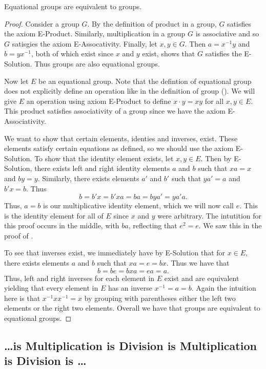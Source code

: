 \documentclass{article}
\begin{document}
\begin{theorem}
  Equational groups are equivalent to groups.
\end{theorem}
\begin{proof}
  Consider a group $G$.
  By the definition of product in a group, $G$ satisfies the axiom E-Product.
  Similarly, multiplication in a group $G$ is associative and so $G$ satisgies the axiom E-Assocativity.
  Finally, let $x, y \in G$.
  Then $a = x^{-1}y$ and $b = yx^{-1}$, both of which exist since $x$ and $y$ exist, shows that $G$ satisfies the E-Solution.
  Thus groups are also equational groups.

  Now let $E$ be an equational group.
  Note that the defintion of equational group does not explicitly define an operation like in the definition of group ().
  We will give $E$ an operation using axiom E-Product to define $x \cdot y = xy$ for all $x, y \in E$.
  This product satisfies associativity of a group since we have the axiom E-Associativity.

  We want to show that certain elements, identies and inverses, exist.
  These elements satisfy certain equations as defined, so we should use the axiom E-Solution.
  To show that the identity element exists, let $x, y \in E$.
  Then by E-Solution, there exists left and right identity elements $a$ and $b$ such that $xa = x$ and $by = y$.
  Similarly, there exists elements $a'$ and $b'$ such that $ya' = a$ and $b'x = b$.
  Thus
  \[
    b = b'x = b'xa = ba = bya' = ya' a.
  \]
  Thus, $a = b$ is our multiplicative identity element, which we will now call $e$.
  This is the identity element for all of $E$ since $x$ and $y$ were arbitrary.
  The intutition for this proof occurs in the middle, with $ba$, reflecting that $e^{2} = e$.
  We saw this in the proof of .

  To see that inverses exist, we immediately have by E-Solution that for $x \in E$, there exists elements $a$ and $b$ such that $xa = e = bx$.
  Thus we have that
  \[
    b = be = bxa = ea = a.
  \]
  Thus, left and right inverses for each element in $E$ exist and are equivalent yielding that every element in $E$ has an inverse $x^{-1} = a = b$.
  Again the intuition here is that $x^{-1} x x^{-1} = x$ by grouping with parentheses either the left two elements or the right two elements.
  Overall we have that groups are equivalent to equational groups.
\end{proof}

\subsection*{\ldots is Multiplication is Division is Multiplication is Division is \ldots}
\end{document}
